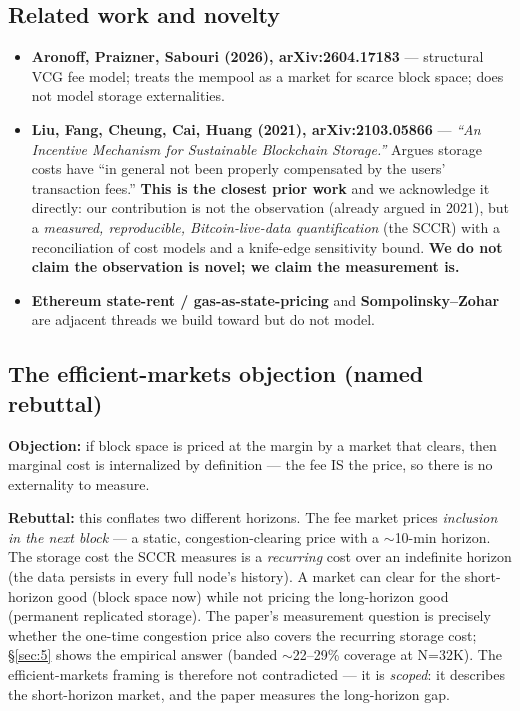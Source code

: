 \documentclass[11pt]{article}
\begin{document}
\subsection{Related work and novelty}\label{sec:8.2}
\begin{itemize}[nosep]
  \item \textbf{Aronoff, Praizner, Sabouri (2026), arXiv:2604.17183} --- structural VCG fee model; treats the mempool as a market for scarce block space; does not model storage externalities.
  \item \textbf{Liu, Fang, Cheung, Cai, Huang (2021), arXiv:2103.05866} --- \emph{``An Incentive Mechanism for Sustainable Blockchain Storage.''} Argues storage costs have ``in general not been properly compensated by the users' transaction fees.'' \textbf{This is the closest prior work} and we acknowledge it directly: our contribution is not the observation (already argued in 2021), but a \emph{measured, reproducible, Bitcoin-live-data quantification} (the SCCR) with a reconciliation of cost models and a knife-edge sensitivity bound. \textbf{We do not claim the observation is novel; we claim the measurement is.}
  \item \textbf{Ethereum state-rent / gas-as-state-pricing} and \textbf{Sompolinsky--Zohar} are adjacent threads we build toward but do not model.
\end{itemize}
\subsection{The efficient-markets objection (named rebuttal)}\label{sec:8.3}
\textbf{Objection:} if block space is priced at the margin by a market that clears, then marginal cost is internalized by definition --- the fee IS the price, so there is no externality to measure.

\textbf{Rebuttal:} this conflates two different horizons. The fee market prices \emph{inclusion in the next block} --- a static, congestion-clearing price with a $\sim$10-min horizon. The storage cost the SCCR measures is a \emph{recurring} cost over an indefinite horizon (the data persists in every full node's history). A market can clear for the short-horizon good (block space now) while not pricing the long-horizon good (permanent replicated storage). The paper's measurement question is precisely whether the one-time congestion price also covers the recurring storage cost; \S\ref{sec:5} shows the empirical answer (banded $\sim$22--29\% coverage at N=32K). The efficient-markets framing is therefore not contradicted --- it is \emph{scoped}: it describes the short-horizon market, and the paper measures the long-horizon gap.
\end{document}
